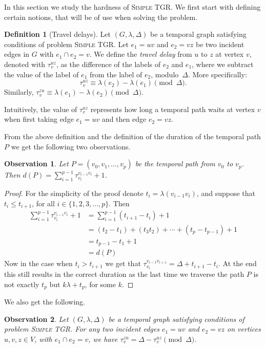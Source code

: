 \documentclass[11pt,a4paper]{article}
\newtheorem{observation}{Observation}
\theoremstyle{remark}
\theoremstyle{definition}
\newtheorem{definition}[theorem]{Definition}
\newcommand{\deltaExact}{\textsc{Simple TGR}}
\begin{document}
In this section we study the hardness of \deltaExact. We first start with defining certain notions, that will be of use when solving the problem.

    \begin{definition}[Travel delays]
    Let $(G, \lambda, \Delta)$ be a temporal graph satisfying conditions of problem \deltaExact.
    Let $e_1=uv$ and $e_2=vz$ be two incident edges in $G$ with $e_1 \cap e_2 = v$.
    We define the \emph{travel delay} from $u$ to $z$ at vertex $v$, denoted with $\tau_v^{uz}$,
    as the difference of the labels of $e_2$ and $e_1$, where we subtract the value of the label of $e_1$ from the label of $e_2$,  modulo~$\Delta$.
    More specifically:
    \begin{equation}\label{eq:def-VertexWaitingTime}
       \tau_v^{uz} \equiv \lambda (e_2) - \lambda(e_1) \pmod \Delta.
    \end{equation}
    Similarly, $\tau_v^{zu} \equiv \lambda (e_1) - \lambda(e_2) \pmod \Delta$.
    \end{definition}
    Intuitively, the value of $\tau_v^{uz}$ represents how long a temporal path waits at vertex $v$ when first taking edge $e_1=uv$ and then edge $e_2 = vz$.

    From the above definition and the definition of the duration of the temporal path $P$ we get the following two observations.
    \begin{observation}\label{obs:durationPwithWaitingTimes}
        Let $P = (v_0, v_1, \dots, v_p)$ be the temporal path from $v_0$ to $v_p$.
        Then $d(P) = \sum_{i = 1}^{p-1} \tau_{v_i}^{v_{i-1}v_i} + 1 $.
    \end{observation}
    \begin{proof}
        For the simplicity of the proof denote $t_i = \lambda(v_{i-1}v_i)$, and suppose that $t_i \leq t_{i+1}$, for all $i \in \{1,2,3,\dots,p\}$.
        Then
        \begin{align*}
        \sum_{i = 1}^{p-1} \tau_{v_i}^{v_{i-1}v_i} + 1  
        &= \sum _{i = 1}^{p-1} (t_{i+1} - t_i) + 1 \\
        & = (t_2 - t_1) + (t_3  t_2) + \cdots + (t_p - t_{p-1}) + 1  \\
        & = t_{p-1} - t_1 + 1\\
        & = d(P)
        \end{align*}
        Now in the case when $t_i > t_{i+1}$ we get that $\tau_{v_i}^{v_{i-1}v_{i+1}} = \Delta + t_{i+1} - t_i$.
        At the end this still results in the correct duration as the last time we traverse the path $P$ is not exactly $t_p$ but $k \lambda + t_p$, for some $k$.
    \end{proof}
    We also get the following.
    \begin{observation}\label{obs:travel-delays-both-directions}
    Let $(G, \lambda, \Delta)$ be a temporal graph satisfying conditions of problem \deltaExact.
    For any two incident edges $e_1 = uv$ and $e_2 = vz$ on vertices $u,v,z \in V$, with $e_1 \cap e_2 = v$, we have $\tau_v^{zu} = \Delta - \tau_v^{uz} \pmod \Delta$.
    \end{observation}
    
\end{document}
